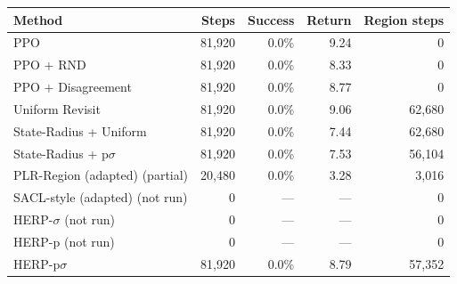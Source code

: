 \begin{tabular}{lrrrr}
\toprule
Method & Steps & Success & Return & Region steps \\
\midrule
PPO & 81,920 & 0.0\% & 9.24 & 0 \\
PPO + RND & 81,920 & 0.0\% & 8.33 & 0 \\
PPO + Disagreement & 81,920 & 0.0\% & 8.77 & 0 \\
Uniform Revisit & 81,920 & 0.0\% & 9.06 & 62,680 \\
State-Radius + Uniform & 81,920 & 0.0\% & 7.44 & 62,680 \\
State-Radius + p$\sigma$ & 81,920 & 0.0\% & 7.53 & 56,104 \\
PLR-Region (adapted) (partial) & 20,480 & 0.0\% & 3.28 & 3,016 \\
SACL-style (adapted) (not run) & 0 & --- & --- & 0 \\
HERP-$\sigma$ (not run) & 0 & --- & --- & 0 \\
HERP-p (not run) & 0 & --- & --- & 0 \\
HERP-p$\sigma$ & 81,920 & 0.0\% & 8.79 & 57,352 \\
\bottomrule
\end{tabular}